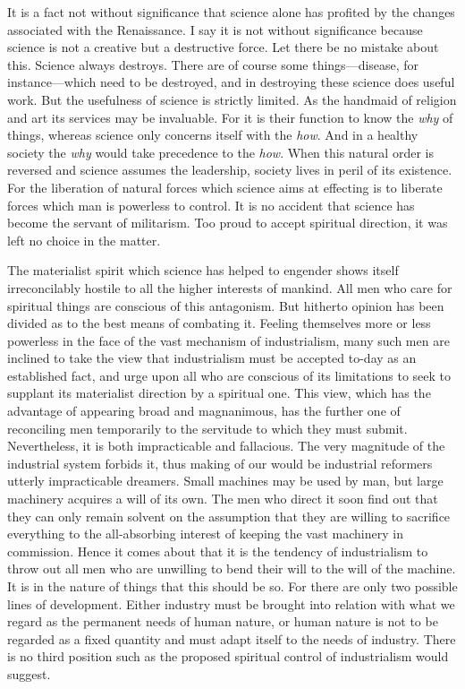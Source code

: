 \documentclass{book}
\begin{document}
It is a fact not without significance that science alone has profited by the changes associated with the Renaissance. I say it is not without significance because science is not a creative but a destructive force. Let there be no mistake about this. Science always destroys. There are of course some things—disease, for instance—which need to be destroyed, and in destroying these science does useful work. But the usefulness of science is strictly limited. As the handmaid of religion and art its services may be invaluable. For it is their function to know the \emph{why} of things, whereas science only concerns itself with the \emph{how}. And in a healthy society the \emph{why} would take precedence to the \emph{how}. When this natural order is reversed and science assumes the leadership, society lives in peril of its existence. For the liberation of natural forces which science aims at effecting is to liberate forces which man is powerless to control. It is no accident that science has become the servant of militarism. Too proud to accept spiritual direction, it was left no choice in the matter.

The materialist spirit which science has helped to engender shows itself irreconcilably hostile to all the higher interests of mankind. All men who care for spiritual things are conscious of this antagonism. But hitherto opinion has been divided as to the best means of combating it. Feeling themselves more or less powerless in the face of the vast mechanism of industrialism, many such men are inclined to take the view that industrialism must be accepted to-day as an established fact, and urge upon all who are conscious of its limitations to seek to supplant its materialist direction by a spiritual one. This view, which has the advantage of appearing broad and magnanimous, has the further one of reconciling men temporarily to the servitude to which they must submit. Nevertheless, it is both impracticable and fallacious. The very magnitude of the industrial system forbids it, thus making of our would be industrial reformers utterly impracticable dreamers. Small machines may be used by man, but large machinery acquires a will of its own. The men who direct it soon find out that they can only remain solvent on the assumption that they are willing to sacrifice everything to the all-absorbing interest of keeping the vast machinery in commission. Hence it comes about that it is the tendency of industrialism to throw out all men who are unwilling to bend their will to the will of the machine. It is in the nature of things that this should be so. For there are only two possible lines of development. Either industry must be brought into relation with what we regard as the permanent needs of human nature, or human nature is not to be regarded as a fixed quantity and must adapt itself to the needs of industry. There is no third position such as the proposed spiritual control of industrialism would suggest.
\end{document}
